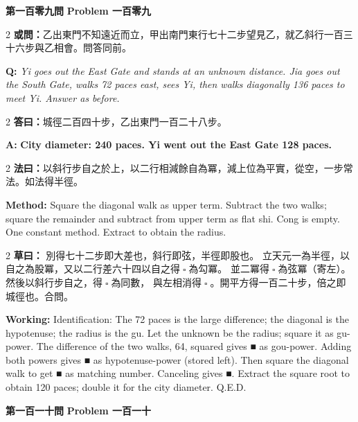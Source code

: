 \documentclass[11pt,a4paper]{article}
\let\origsquare\square
\renewcommand{\square}{\ensuremath{\origsquare}}%
\newcommand{\wen}[1]{%
  \par\vspace{0.5em}%
  \noindent\textcolor{problemcolor}{\textbf{第#1問}}%
  \hfill\textcolor{problemcolor}{\textbf{Problem #1}}\par\nopagebreak%
  \vspace{0.3em}%
}
\newcommand{\owen}[1]{%
  \noindent\textcolor{problemcolor}{\textbf{或問：}}{\tradfont #1}\par\nopagebreak%
}
\newcommand{\oweneng}[1]{%
  \noindent\textcolor{engcolor}{\textbf{Q: }}{\itshape #1}\par\nopagebreak%
}
\newcommand{\fayue}[1]{%
  \noindent\textcolor{methodcolor}{\textbf{法曰：}}{\tradfont #1}\par\nopagebreak%
}
\newcommand{\fayueeng}[1]{%
  \noindent\textcolor{engcolor}{\textbf{Method: }}{#1}\par\nopagebreak%
}
\newcommand{\tsaoyue}[1]{%
  \noindent\textcolor{workcolor}{\textbf{草曰：}}{\tradfont #1}\par%
}
\newcommand{\tsaoyueeng}[1]{%
  \noindent\textcolor{engcolor}{\textbf{Working: }}{\small #1}\par%
}
\newcommand{\dayue}[1]{%
  \noindent\textcolor{anscolor}{\textbf{答曰：}}{\tradfont #1}\par\nopagebreak%
}
\newcommand{\dayueeng}[1]{%
  \noindent\textcolor{engcolor}{\textbf{A: }}{\bfseries #1}\par\nopagebreak%
}
\begin{document}
\vspace{0.5cm}

\wen{一百零九}

\begin{paracol}{2}
\owen{乙出東門不知遠近而立，甲出南門東行七十二步望見乙，就乙斜行一百三十六步與乙相會。問答同前。}
\switchcolumn
\oweneng{Yi goes out the East Gate and stands at an unknown distance. Jia goes out the South Gate, walks 72 paces east, sees Yi, then walks diagonally 136 paces to meet Yi. Answer as before.}
\end{paracol}

\begin{paracol}{2}
\dayue{城徑二百四十步，乙出東門一百二十八步。}
\switchcolumn
\dayueeng{City diameter: 240 paces. Yi went out the East Gate 128 paces.}
\end{paracol}

\begin{paracol}{2}
\fayue{以斜行步自之於上，以二行相減餘自為冪，減上位為平實，從空，一步常法。如法得半徑。}
\switchcolumn
\fayueeng{Square the diagonal walk as upper term. Subtract the two walks; square the remainder and subtract from upper term as flat shi. Cong is empty. One constant method. Extract to obtain the radius.}
\end{paracol}

\begin{paracol}{2}
\tsaoyue{%
別得七十二步即大差也，斜行即弦，半徑即股也。
立天元一為半徑，以自之為股冪，又以二行差六十四以自之得$ \; \square \; $為勾冪。
並二冪得$ \; \square \; $為弦冪（寄左）。然後以斜行步自之，得$ \; \square \; $為同數，
與左相消得$ \; \square \; $。開平方得一百二十步，倍之即城徑也。合問。}
\switchcolumn
\tsaoyueeng{%
Identification: The 72 paces is the large difference; the diagonal is the hypotenuse; the radius is the gu. Let the unknown be the radius; square it as gu-power. The difference of the two walks, 64, squared gives ■ as gou-power. Adding both powers gives ■ as hypotenuse-power (stored left). Then square the diagonal walk to get ■ as matching number. Canceling gives ■. Extract the square root to obtain 120 paces; double it for the city diameter. Q.E.D.}
\end{paracol}

\vspace{0.5cm}

\wen{一百一十}
\end{document}
